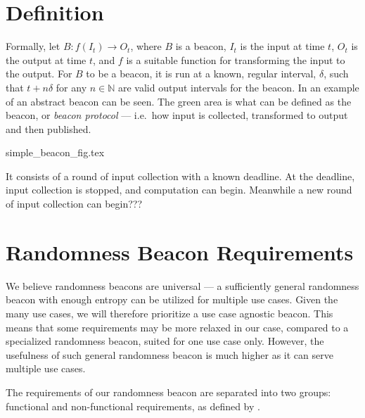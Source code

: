 \section{Definition}


Formally, let $B: f(I_t) \rightarrow O_t$, where $B$ is a beacon, $I_t$ is the input at time $t$, $O_t$ is the output at time $t$, and $f$ is a suitable function for transforming the input to the output.
For $B$ to be a beacon, it is run at a known, regular interval, $\delta$, such that $t+n\delta$ for any $n \in \mathbb{N}$ are valid output intervals for the beacon.
In  an example of an abstract beacon can be seen.
The green area is what can be defined as the beacon, or \emph{beacon protocol} --- i.e.\ how input is collected, transformed to output and then published.

{simple_beacon_fig.tex}


It consists of a round of input collection with a known deadline. At the deadline, input collection is stopped, and computation can begin. Meanwhile a new round of input collection can begin???

\section{Randomness Beacon Requirements}
\label{sec:beacon_requirements}

We believe randomness beacons are universal --- a sufficiently general randomness beacon with enough entropy can be utilized for multiple use cases. Given the many use cases, we will therefore prioritize a use case agnostic beacon.
This means that some requirements may be more relaxed in our case, compared to a specialized randomness beacon, suited for one use case only. However, the usefulness of such general randomness beacon is much higher as it can serve multiple use cases.

The requirements of our randomness beacon are separated into two groups: functional and non-functional requirements, as defined by \citet[sec.\ 1.4.1]{swebok} .

